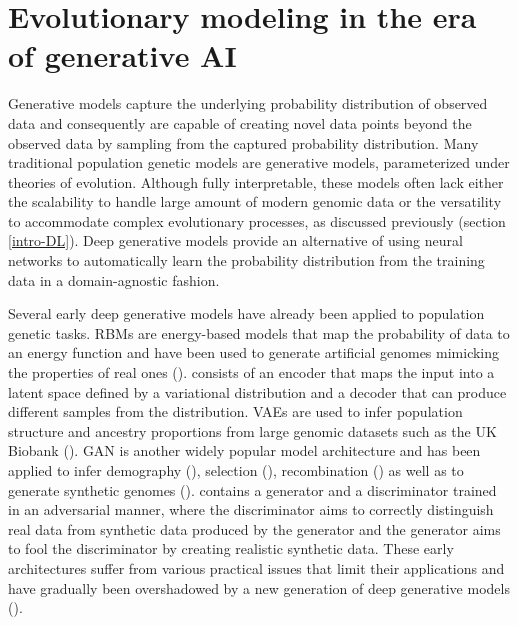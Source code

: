 \section{Evolutionary modeling in the era of generative \ac{AI}} \label{evo-genAI}

Generative models capture the underlying probability distribution of observed data and consequently are capable of creating novel data points beyond the observed data by sampling from the captured probability distribution. Many traditional population genetic models are generative models, parameterized under theories of evolution. Although fully interpretable, these models often lack either the scalability to handle large amount of modern genomic data or the versatility to accommodate complex evolutionary processes, as discussed previously (section \ref{intro-DL}). Deep generative models provide an alternative of using neural networks to automatically learn the probability distribution from the training data in a domain-agnostic fashion.

Several early deep generative models have already been applied to population genetic tasks. \Acp{RBM} are energy-based models that map the probability of data to an energy function and have been used to generate artificial genomes mimicking the properties of real ones (\cite{yelmen2021creating,yelmen2023deep}).  consists of an encoder that maps the input into a latent space defined by a variational distribution and a decoder that can produce different samples from the distribution. \Acp{VAE} are used to infer population structure and ancestry proportions from large genomic datasets such as the UK Biobank (\cite{meisner2022haplotype}). \Acf{GAN} is another widely popular model architecture and has been applied to infer demography (\cite{wang_automatic_2021}), selection (\cite{riley2023interpreting}), recombination (\cite{gower2023inference}) as well as to generate synthetic genomes (\cite{yelmen2021creating,yelmen2023deep}).  contains a generator and a discriminator trained in an adversarial manner, where the discriminator aims to correctly distinguish real data from synthetic data produced by the generator and the generator aims to fool the discriminator by creating realistic synthetic data. These early architectures suffer from various practical issues that limit their applications and have gradually been overshadowed by a new generation of deep generative models (\cite{huang_harnessing_2023}).

